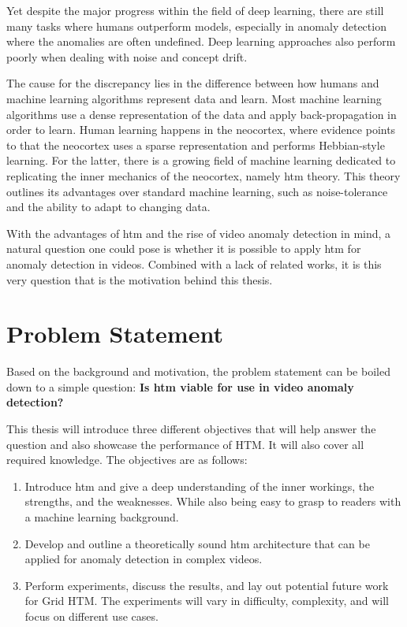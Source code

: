 Yet despite the major progress within the field of deep learning, there are still many tasks where humans outperform models, especially in anomaly detection where the anomalies are often undefined. Deep learning approaches also perform poorly when dealing with noise and concept drift.
\par
The cause for the discrepancy lies in the difference between how humans and machine learning algorithms represent data and learn. Most machine learning algorithms use a dense representation of the data and apply back-propagation in order to learn. Human learning happens in the neocortex, where evidence points to that the neocortex uses a sparse representation and performs Hebbian-style learning. For the latter, there is a growing field of machine learning dedicated to replicating the inner mechanics of the neocortex, namely  \gls*{htm} theory. This theory outlines its advantages over standard machine learning, such as noise-tolerance and the ability to adapt to changing data.
\par
With the advantages of  \gls*{htm} and the rise of video anomaly detection in mind, a natural question one could pose is whether it is possible to apply  \gls*{htm} for anomaly detection in videos. Combined with a lack of related works, it is this very question that is the motivation behind this thesis.

\section{Problem Statement}
\label{sec:problem_statement}
Based on the background and motivation, the problem statement can be boiled down to a simple question: \textbf{Is \gls*{htm} viable for use in video anomaly detection?}\par
This thesis will introduce three different objectives that will help answer the question and also showcase the performance of HTM. It will also cover all required knowledge. The objectives are as follows:
\begin{enumerate}
    \item Introduce  \gls*{htm} and give a deep understanding of the inner workings, the strengths, and the weaknesses. While also being easy to grasp to readers with a machine learning background.
    \item Develop and outline a theoretically sound \gls*{htm} architecture that can be applied for anomaly detection in complex videos.
    \item Perform experiments, discuss the results, and lay out potential future work for Grid HTM. The experiments will vary in difficulty, complexity, and will focus on different use cases.
\end{enumerate}

